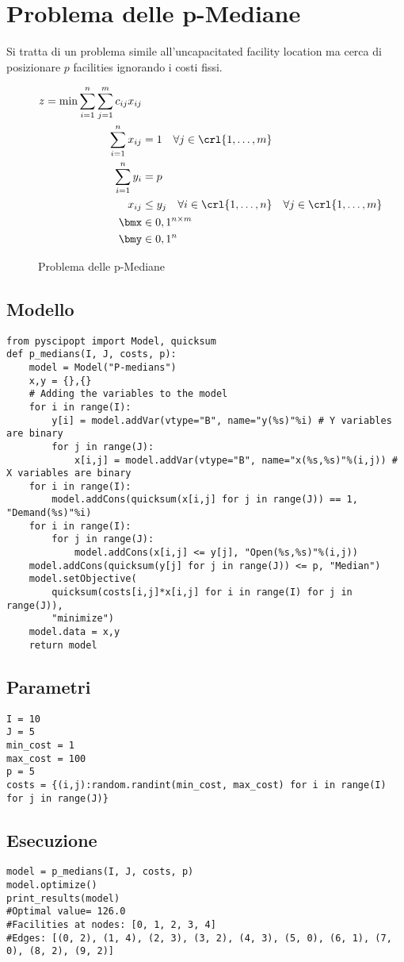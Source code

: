 \documentclass[\main/main.tex]{subfiles}
\begin{document}
\chapter{Problema delle p-Mediane}
Si tratta di un problema simile all'uncapacitated facility location ma cerca di posizionare \(p\) facilities ignorando i costi fissi.

\begin{figure}
    \begin{align*}
        z = \min \sum_{i=1}^n \sum_{j=1}^m c_{ij} x_{ij} \\
        \sum_{i=1}^n x_{ij} &= 1 \quad \forall j \in \crl{1, \ldots, m}\\
        \sum_{i=1}^n y_{i} &= p\\
        x_{ij} &\leq y_j \quad \forall i \in \crl{1, \ldots, n} \quad \forall j \in \crl{1, \ldots, m}\\
        \bmx &\in {0,1}^{n\times m}\\
        \bmy &\in {0,1}^n
    \end{align*}
    \caption{Problema delle p-Mediane}
\end{figure}

\section{Modello}
\begin{verbatim}
from pyscipopt import Model, quicksum
def p_medians(I, J, costs, p):
    model = Model("P-medians")
    x,y = {},{}
    # Adding the variables to the model
    for i in range(I):
        y[i] = model.addVar(vtype="B", name="y(%s)"%i) # Y variables are binary
        for j in range(J):
            x[i,j] = model.addVar(vtype="B", name="x(%s,%s)"%(i,j)) # X variables are binary
    for i in range(I):
        model.addCons(quicksum(x[i,j] for j in range(J)) == 1, "Demand(%s)"%i)
    for i in range(I):
        for j in range(J):
            model.addCons(x[i,j] <= y[j], "Open(%s,%s)"%(i,j))
    model.addCons(quicksum(y[j] for j in range(J)) <= p, "Median")
    model.setObjective(
        quicksum(costs[i,j]*x[i,j] for i in range(I) for j in range(J)),
        "minimize")
    model.data = x,y
    return model
\end{verbatim}

\section{Parametri}
\begin{verbatim}
I = 10
J = 5
min_cost = 1
max_cost = 100
p = 5
costs = {(i,j):random.randint(min_cost, max_cost) for i in range(I) for j in range(J)}
\end{verbatim}
\section{Esecuzione}
\begin{verbatim}
model = p_medians(I, J, costs, p)
model.optimize()
print_results(model)
#Optimal value= 126.0
#Facilities at nodes: [0, 1, 2, 3, 4]
#Edges: [(0, 2), (1, 4), (2, 3), (3, 2), (4, 3), (5, 0), (6, 1), (7, 0), (8, 2), (9, 2)]
\end{verbatim}
\end{document}
